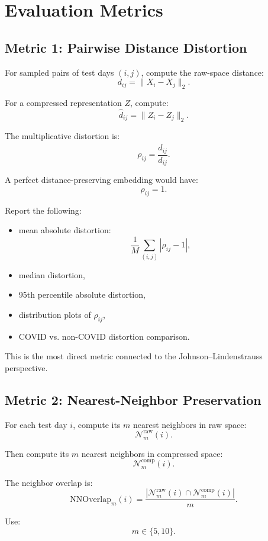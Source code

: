\documentclass[11pt]{article}
\begin{document}
\section{Evaluation Metrics}

\subsection{Metric 1: Pairwise Distance Distortion}

For sampled pairs of test days $(i,j)$, compute the raw-space distance:
\[
d_{ij} = \|X_i - X_j\|_2.
\]

For a compressed representation $Z$, compute:
\[
\hat{d}_{ij} = \|Z_i - Z_j\|_2.
\]

The multiplicative distortion is:
\[
\rho_{ij} = \frac{\hat{d}_{ij}}{d_{ij}}.
\]

A perfect distance-preserving embedding would have:
\[
\rho_{ij} = 1.
\]

Report the following:

\begin{itemize}
    \item mean absolute distortion:
    \[
    \frac{1}{M}\sum_{(i,j)} |\rho_{ij} - 1|,
    \]
    \item median distortion,
    \item 95th percentile absolute distortion,
    \item distribution plots of $\rho_{ij}$,
    \item COVID vs. non-COVID distortion comparison.
\end{itemize}

This is the most direct metric connected to the Johnson--Lindenstrauss perspective.

\subsection{Metric 2: Nearest-Neighbor Preservation}

For each test day $i$, compute its $m$ nearest neighbors in raw space:
\[
\mathcal{N}^{\text{raw}}_m(i).
\]

Then compute its $m$ nearest neighbors in compressed space:
\[
\mathcal{N}^{\text{comp}}_m(i).
\]

The neighbor overlap is:
\[
\text{NNOverlap}_m(i)
=
\frac{
\left|
\mathcal{N}^{\text{raw}}_m(i)
\cap
\mathcal{N}^{\text{comp}}_m(i)
\right|
}{m}.
\]

Use:
\[
m \in \{5, 10\}.
\]
\end{document}
